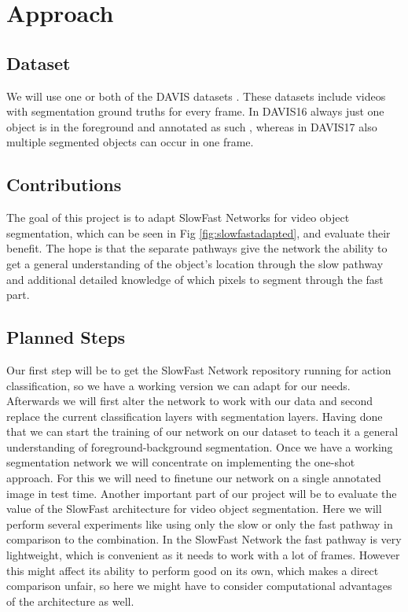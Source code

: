 \documentclass[conference]{IEEEtran}
\begin{document}
\section{Approach}
\subsection{Dataset}
We will use one or both of the DAVIS datasets \cite{davis_2016,davis_2017}. These datasets include videos with segmentation ground truths for every frame. In DAVIS16 always just one object is in the foreground and annotated as such , whereas in DAVIS17 also multiple segmented objects can occur in one frame. 
\subsection{Contributions}
The goal of this project is to adapt SlowFast Networks for video object segmentation, which can be seen in Fig \ref{fig:slowfastadapted}, and evaluate their benefit. The hope is that the separate pathways give the network the ability to get a general understanding of the object’s location through the slow pathway and additional detailed knowledge of which pixels to segment through the fast part.


\subsection{Planned Steps}
Our first step will be to get the SlowFast Network repository running for action classification, so we have a working version we can adapt for our needs. Afterwards  we will first alter the network to work with our data and second replace the current classification layers with segmentation layers. Having done that we can start the training of our network on our dataset to teach it a general understanding of foreground-background segmentation.
Once we have a working segmentation network we will concentrate on implementing the one-shot approach. For this we will need to finetune our network on a single annotated image in test time.
Another important part of our project will be to evaluate the value of the SlowFast architecture for video object segmentation. Here we will perform several experiments like using only the slow or only the fast pathway in comparison to the combination. In the SlowFast Network the fast pathway is very lightweight, which is convenient as it needs to work with a lot of frames. However this might affect its ability to perform good on its own, which makes a direct comparison unfair, so here we might have to consider computational advantages of the architecture as well.
\end{document}
